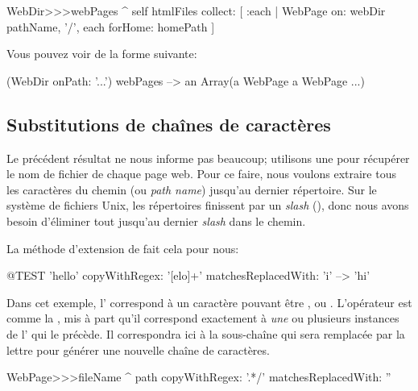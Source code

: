 \documentclass[a4paper,10pt,twoside]{book}
\begin{document}
\begin{code}{}
WebDir>>>webPages
	^ self htmlFiles collect: 
		[ :each | WebPage 
			on: webDir pathName, '/', each
			forHome: homePath ]
\end{code}

\noindent{} Vous pouvez voir de la forme suivante:

\begin{code}{}
(WebDir onPath: '...') webPages --> an Array(a WebPage a WebPage ...)
\end{code}

\subsection{Substitutions de chaînes de caractères}

Le précédent résultat ne nous informe pas beaucoup; utilisons une
\expreg pour récupérer le nom de fichier de chaque page web.
Pour ce faire, nous voulons extraire tous les caractères du chemin (ou
\emph{path name}) jusqu'au dernier répertoire. Sur le système de
fichiers Unix, les répertoires finissent par un \emph{slash} (\ct{/}),
donc nous avons besoin d'éliminer tout jusqu'au dernier \emph{slash}
dans le chemin.

La méthode d'extension de 
 fait cela pour
nous:

\begin{code}{@TEST}
'hello' copyWithRegex: '[elo]+' matchesReplacedWith: 'i' --> 'hi'
\end{code}

Dans cet exemple, l'\expreg \ct{[elo]} correspond à un caractère
pouvant être ,  ou . %
L'opérateur \ct{+} est comme la \kleenestar, mis à part qu'il
correspond exactement à \emph{une} ou plusieurs instances de l'\expreg
qui le précède. Il correspondra ici à la sous-chaîne  qui
sera remplacée par la lettre  pour générer une nouvelle chaîne de
caractères.


\begin{code}{}
WebPage>>>fileName
	^ path copyWithRegex: '.*/' matchesReplacedWith: ''
\end{code}
\end{document}
